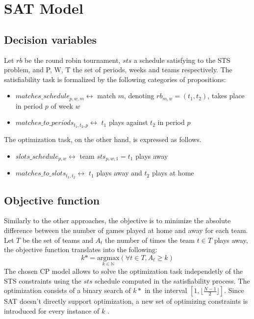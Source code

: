 \section{SAT Model}

\subsection{Decision variables}
Let $rb$ be the round robin tournament, $sts$ a schedule satisfying to the STS problem, and P, W, T the set of periods, weeks and teams respectively.
The satisfiability task is formalized by the following categories of propositions:
\begin{itemize}
    \item $matches\_schedule_{p, w, m} \leftrightarrow$ match $m$, denoting $rb_{m, w} = (t_1, t_2)$, takes place in period $p$ of week $w$
    \item $matches\_to\_periods_{t_1, t_2, p} \leftrightarrow$ $t_1$ plays against $t_2$ in period $p$
\end{itemize}
The optimization task, on the other hand, is expressed as follows.
\begin{itemize}
    \item $slots\_schedule_{p, w} \leftrightarrow$ team $sts_{p, w, 1} = t_1$ plays away
    \item $matches\_to\_slots_{t_1, t_2} \leftrightarrow$ $t_1$ plays away and $t_2$ plays at home
\end{itemize}

\subsection{Objective function}
Similarly to the other approaches, the objective is to minimize the absolute difference between the number of games played at home and away for each team.
Let $T$ be the set of teams and $A_t$ the number of times the team $t \in T$ plays away, the objective function translates into the following:
$$
k * = \underset{k \in \mathbb{N}}{\text{argmax}} \left( \forall t \in T, A_t \geq k \right)
$$
The chosen CP model allows to solve the optimization task independetly of the STS constraints using the $sts$ schedule computed in the satisfiability process. The optimization consists of a binary search of $k*$ in the interval $[1, \lfloor\frac{N-1}{2}\rfloor]$. Since SAT doesn't directly support optimization, a new set of optimizing constraints is introduced for every instance of $k$ .

